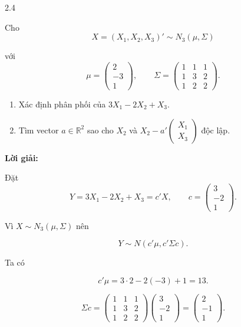 \begin{question}{2.4}

Cho
\[
X=(X_1,X_2,X_3)' \sim N_3(\mu,\Sigma)
\]

với
\[
\mu=
\begin{pmatrix}
2\\
-3\\
1
\end{pmatrix},
\qquad
\Sigma=
\begin{pmatrix}
1&1&1\\
1&3&2\\
1&2&2
\end{pmatrix}.
\]

\begin{enumerate}
\item[(a)] Xác định phân phối của $3X_1-2X_2+X_3$.
\item[(b)] Tìm vector $a\in\mathbb{R}^2$ sao cho $X_2$ và 
$X_2-a'\begin{pmatrix}X_1\\X_3\end{pmatrix}$ độc lập.
\end{enumerate}

\textbf{Lời giải:}

\begin{subquestion}
\begin{answer}

Đặt
\[
Y=3X_1-2X_2+X_3=c'X,
\qquad
c=
\begin{pmatrix}
3\\
-2\\
1
\end{pmatrix}.
\]

Vì $X\sim N_3(\mu,\Sigma)$ nên

\[
Y \sim N(c'\mu,c'\Sigma c).
\]

Ta có

\[
c'\mu=3\cdot2-2(-3)+1=13.
\]

\[
\Sigma c=
\begin{pmatrix}
1&1&1\\
1&3&2\\
1&2&2
\end{pmatrix}
\begin{pmatrix}
3\\
-2\\
1
\end{pmatrix}
=
\begin{pmatrix}
2\\
-1\\
1
\end{pmatrix}.
\]


\end{answer}
\end{subquestion}
\end{question}
